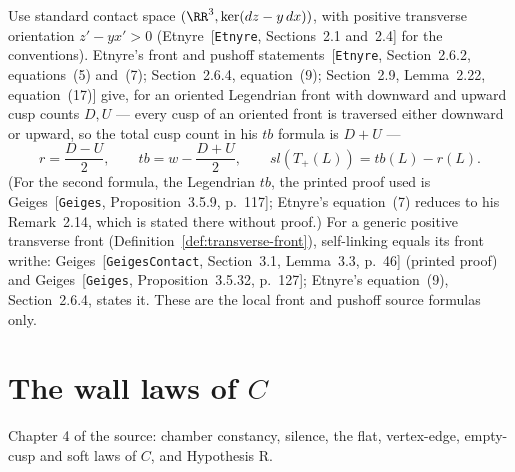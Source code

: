 \begin{literature}\label{src:contact}\leanok{}
Use standard contact space
$(\RR^3,\ker(dz-y\,dx))$, with positive transverse orientation
$z'-yx'>0$ (Etnyre~\textnormal{[\texttt{Etnyre}, Sections~2.1 and~2.4]} for the
conventions). Etnyre's front and pushoff
statements~\textnormal{[\texttt{Etnyre}, Section~2.6.2, equations~(5) and~(7); Section~2.6.4,
equation~(9); Section~2.9, Lemma~2.22, equation~(17)]} give, for
an oriented Legendrian front with downward and upward cusp counts $D,U$
--- every cusp of an oriented front is traversed either downward or
upward, so the total cusp count in his $tb$ formula is $D+U$ ---
\begin{equation}\label{fd:contact-inputs}
 r=\frac{D-U}{2},\qquad tb=w-\frac{D+U}{2},\qquad
 sl(T_+(L))=tb(L)-r(L).
\end{equation}
(For the second formula, the Legendrian $tb$, the printed proof used is
Geiges~\textnormal{[\texttt{Geiges}, Proposition~3.5.9, p.~117]}; Etnyre's equation~(7)
reduces to his Remark~2.14, which is stated there without proof.)
For a generic positive transverse front
(Definition~\ref{def:transverse-front}), self-linking equals its front
writhe: Geiges~\textnormal{[\texttt{GeigesContact}, Section~3.1, Lemma~3.3, p.~46]} (printed
proof) and Geiges~\textnormal{[\texttt{Geiges}, Proposition~3.5.32, p.~127]}; Etnyre's
equation~(9), Section~2.6.4, states it. These are the local front and
pushoff source formulas only.

\end{literature}

\chapter{The wall laws of $C$}
Chapter 4 of the source: chamber constancy, silence, the flat, vertex-edge, empty-cusp and soft laws of $C$, and Hypothesis R.

